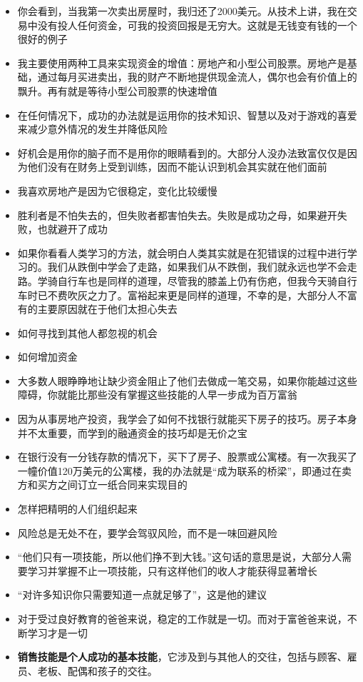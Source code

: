 \documentclass[UTF8,a4paper,8pt]{ctexbook}
\begin{document}
\begin{itemize}
			\item 你会看到，当我第一次卖出房屋时，我归还了2000美元。从技术上讲，我在交易中没有投人任何资金，可我的投资回报是无穷大。这就是无钱变有钱的一个很好的例子
			\item 我主要使用两种工具来实现资金的增值：房地产和小型公司股票。房地产是基础，通过每月买进卖出，我的财产不断地提供现金流人，偶尔也会有价值上的飘升。再有就是等待小型公司股票的快速增值
			\item 在任何情况下，成功的办法就是运用你的技术知识、智慧以及对于游戏的喜爱来减少意外情况的发生并降低风险
			\item 好机会是用你的脑子而不是用你的眼睛看到的。大部分人没办法致富仅仅是因为他们没有在财务上受到训练，因而不能认识到机会其实就在他们面前
			\item 我喜欢房地产是因为它很稳定，变化比较缓慢
			\item 胜利者是不怕失去的，但失败者都害怕失去。失败是成功之母，如果避开失败，也就避开了成功
			\item 如果你看看人类学习的方法，就会明白人类其实就是在犯错误的过程中进行学习的。我们从跌倒中学会了走路，如果我们从不跌倒，我们就永远也学不会走路。学骑自行车也是同样的道理，尽管我的膝盖上仍有伤疤，但我今天骑自行车时已不费吹灰之力了。富裕起来更是同样的道理，不幸的是，大部分人不富有的主要原因就在于他们太担心失去
			\item 如何寻找到其他人都忽视的机会
			\item 如何增加资金
			\item 大多数人眼睁睁地让缺少资金阻止了他们去做成一笔交易，如果你能越过这些障碍，你就能比那些没有掌握这些技能的人早一步成为百万富翁
			\item 因为从事房地产投资，我学会了如何不找银行就能买下房子的技巧。房子本身并不太重要，而学到的融通资金的技巧却是无价之宝
			\item 在银行没有一分钱存款的情况下，买下了房子、股票或公寓楼。有一次我买了一幢价值120万美元的公寓楼，我的办法就是“成为联系的桥梁”，即通过在卖方和买方之间订立一纸合同来实现目的
			\item 怎样把精明的人们组织起来
			\item 风险总是无处不在，要学会驾驭风险，而不是一味回避风险
			\item “他们只有一项技能，所以他们挣不到大钱。”这句话的意思是说，大部分人需要学习并掌握不止一项技能，只有这样他们的收人才能获得显著增长
			\item “对许多知识你只需要知道一点就足够了”，这是他的建议
			\item 对于受过良好教育的爸爸来说，稳定的工作就是一切。而对于富爸爸来说，不断学习才是一切
			\item \textbf{销售技能是个人成功的基本技能}，它涉及到与其他人的交往，包括与顾客、雇员、老板、配偶和孩子的交往。
			

\end{itemize}
\end{document}

